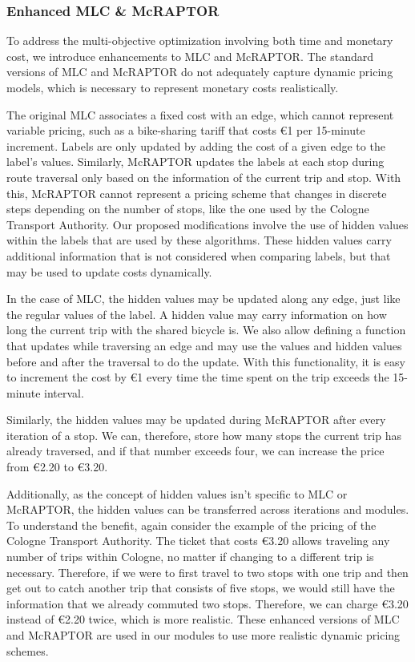 \subsubsection{Enhanced MLC \& McRAPTOR}
\label{subsubsec:enhanced_mlc_and_mcraptor}

To address the multi-objective optimization involving both time and monetary cost, we introduce enhancements to MLC and McRAPTOR. 
The standard versions of MLC and McRAPTOR do not adequately capture dynamic pricing models, which is necessary to represent monetary costs realistically.

The original MLC associates a fixed cost with an edge, which cannot represent variable pricing, such as a bike-sharing tariff that costs \euro{1} per 15-minute increment. 
Labels are only updated by adding the cost of a given edge to the label's values.
Similarly, McRAPTOR updates the labels at each stop during route traversal only based on the information of the current trip and stop. 
With this, McRAPTOR cannot represent a pricing scheme that changes in discrete steps depending on the number of stops, like the one used by the Cologne Transport Authority.
Our proposed modifications involve the use of hidden values within the labels that are used by these algorithms. 
These hidden values carry additional information that is not considered when comparing labels, but that may be used to update costs dynamically.

In the case of MLC, the hidden values may be updated along any edge, just like the regular values of the label.
A hidden value may carry information on how long the current trip with the shared bicycle is.
We also allow defining a function that updates while traversing an edge and may use the values and hidden values before and after the traversal to do the update.
With this functionality, it is easy to increment the cost by \euro{1} every time the time spent on the trip exceeds the 15-minute interval.

Similarly, the hidden values may be updated during McRAPTOR after every iteration of a stop.
We can, therefore, store how many stops the current trip has already traversed, and if that number exceeds four, we can increase the price from \euro{2.20} to \euro{3.20}.

Additionally, as the concept of hidden values isn't specific to MLC or McRAPTOR, the hidden values can be transferred across iterations and modules.
To understand the benefit, again consider the example of the pricing of the Cologne Transport Authority.
The ticket that costs \euro{3.20} allows traveling any number of trips within Cologne, no matter if changing to a different trip is necessary.
Therefore, if we were to first travel to two stops with one trip and then get out to catch another trip that consists of five stops, we would still have the information that we already commuted two stops.
Therefore, we can charge \euro{3.20} instead of \euro{2.20} twice, which is more realistic.
These enhanced versions of MLC and McRAPTOR are used in our modules to use more realistic dynamic pricing schemes.

